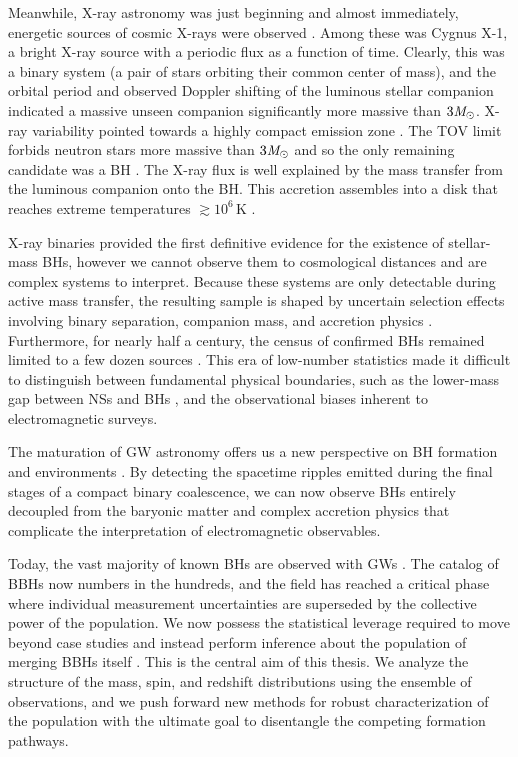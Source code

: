 \begin{refsection}
Meanwhile, X-ray astronomy was just beginning and almost immediately, energetic sources of cosmic X-rays were observed \citep{Bowyer:1965hxq}. Among these was Cygnus X-1, a bright X-ray source with a periodic flux as a function of time. Clearly, this was a binary system (a pair of stars orbiting their common center of mass), and the orbital period and observed Doppler shifting of the luminous stellar companion indicated a massive unseen companion significantly more massive than $3\mathit{M_\odot}$. X-ray variability pointed towards a highly compact emission zone \citep{Oda:1971cyg}. The \ac{TOV} limit forbids neutron stars more massive than $3\mathit{M_\odot}$ \citep{rhoades_maximum_1974, kalogera_maximum_1996} and so the only remaining candidate was a \ac{BH} \citep{webster_cygnus_1972, bolton_identification_1972}. The X-ray flux is well explained by the mass transfer from the luminous companion onto the \ac{BH}. This accretion assembles into a disk that reaches extreme temperatures $\gtrsim 10^6\,\mathrm{K}$ \citep{shakura_black_1973, remillard_x-ray_2006}.

X-ray binaries provided the first definitive evidence for the existence of stellar-mass \acp{BH}, however we cannot observe them to cosmological distances and are complex systems to interpret. Because these systems are only detectable during active mass transfer, the resulting sample is shaped by uncertain selection effects involving binary separation, companion mass, and accretion physics \citep{remillard_x-ray_2006}. Furthermore, for nearly half a century, the census of confirmed \acp{BH} remained limited to a few dozen sources \citep[e.g.][]{Draghis:2023vzj}. This era of low-number statistics made it difficult to distinguish between fundamental physical boundaries, such as the lower-mass gap between \acp{NS} and \acp{BH} \citep{ozel_black_2010, farr_mass_2011}, and the observational biases inherent to electromagnetic surveys.

The maturation of \ac{GW} astronomy offers us a new perspective on \ac{BH} formation and environments \citep{2016PhRvL.116f1102A, LIGOScientific:2016vpg}. By detecting the spacetime ripples emitted during the final stages of a compact binary coalescence, we can now observe \acp{BH} entirely decoupled from the baryonic matter and complex accretion physics that complicate the interpretation of electromagnetic observables.  

Today, the vast majority of known \acp{BH} are observed with \acp{GW} \citep{2019PhRvX...9c1040A, abbott_gwtc-21_2024, KAGRA:2021vkt, abac_gwtc-40_2025}. The catalog of \acp{BBH} now numbers in the hundreds, and the field has reached a critical phase where individual measurement uncertainties are superseded by the collective power of the population. We now possess the statistical leverage required to move beyond case studies and instead perform inference about the population of merging \acp{BBH} itself \citep[e.g.,][]{KAGRA:2021duu, abac_gwtc-40_2025}. This is the central aim of this thesis. We analyze the structure of the mass, spin, and redshift distributions using the ensemble of observations, and we push forward new methods for robust characterization of the population with the ultimate goal to disentangle the competing formation pathways. 


\end{refsection}
